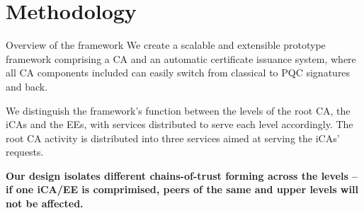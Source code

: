 \documentclass[10pt]{beamer}
\begin{document}
\section{Methodology}
\begin{frame}{Overview of the framework}
	We create a scalable and extensible prototype framework comprising a CA and an automatic certificate issuance system, where all CA components included can easily switch from classical to PQC signatures and back. 
	
	\medskip
	
	We distinguish the framework's function between the levels of the root CA, the iCAs and the EEs, with services distributed to serve each level accordingly. 
	The root CA activity is distributed into three services aimed at serving the iCAs' requests. 
	
	\medskip
		
	\textbf{Our design isolates different chains-of-trust forming across the levels -- if one iCA/EE is comprimised, peers of the same and upper levels will not be affected.}
	
\end{frame}
\end{document}
